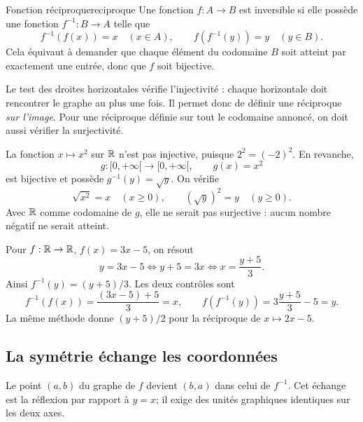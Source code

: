 \begin{definition}{Fonction réciproque}{reciproque}
Une fonction \(f:A\to B\) est inversible si elle possède une fonction \(f^{-1}:B\to A\) telle que
\[
f^{-1}(f(x))=x\quad(x\in A),\qquad f(f^{-1}(y))=y\quad(y\in B).
\]
Cela équivaut à demander que chaque élément du codomaine \(B\) soit atteint par exactement une entrée, donc que \(f\) soit bijective.
\end{definition}

Le test des droites horizontales vérifie l'injectivité : chaque horizontale doit rencontrer le graphe au plus une fois. Il permet donc de définir une réciproque \emph{sur l'image}. Pour une réciproque définie sur tout le codomaine annoncé, on doit aussi vérifier la surjectivité.

\begin{examplebox}[title={Restreindre le carré}]
La fonction \(x\mapsto x^2\) sur \(\mathbb{R}\) n'est pas injective, puisque \(2^2=(-2)^2\). En revanche,
\[
g:[0,+\infty[\to[0,+\infty[,\qquad g(x)=x^2
\]
est bijective et possède \(g^{-1}(y)=\sqrt y\). On vérifie
\[
\sqrt{x^2}=x\quad(x\ge0),\qquad (\sqrt y)^2=y\quad(y\ge0).
\]
Avec \(\mathbb{R}\) comme codomaine de \(g\), elle ne serait pas surjective : aucun nombre négatif ne serait atteint.
\end{examplebox}

\begin{examplebox}[title={Défaire une règle affine}]
Pour \(f:\mathbb{R}\to\mathbb{R}\), \(f(x)=3x-5\), on résout
\[
y=3x-5\iff y+5=3x\iff x=\frac{y+5}{3}.
\]
Ainsi \(f^{-1}(y)=(y+5)/3\). Les deux contrôles sont
\[
f^{-1}(f(x))=\frac{(3x-5)+5}{3}=x,
\qquad f(f^{-1}(y))=3\frac{y+5}{3}-5=y.
\]
La même méthode donne \((y+5)/2\) pour la réciproque de \(x\mapsto2x-5\).
\end{examplebox}

\subsection*{La symétrie échange les coordonnées}
Le point \((a,b)\) du graphe de \(f\) devient \((b,a)\) dans celui de \(f^{-1}\). Cet échange est la réflexion par rapport à \(y=x\); il exige des unités graphiques identiques sur les deux axes.

\begin{center}
\end{center}

